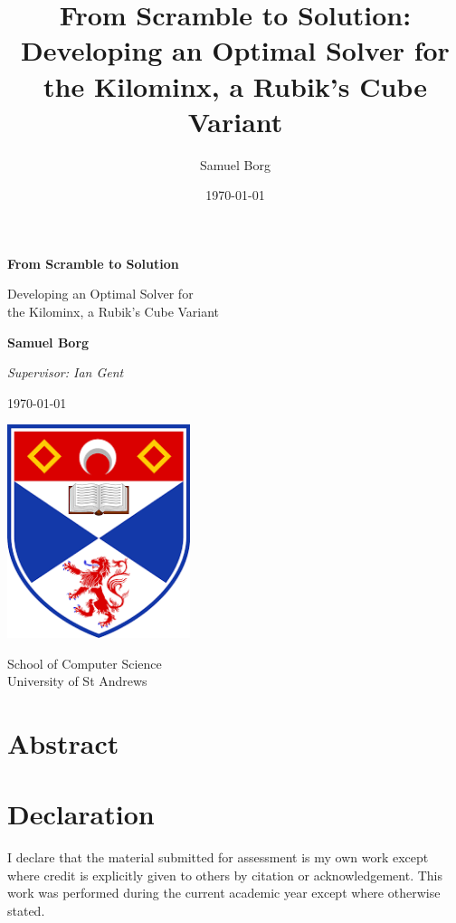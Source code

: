 \documentclass[12pt]{report}
\title{From Scramble to Solution: Developing an Optimal Solver for the Kilominx, a Rubik's Cube Variant}
\author{Samuel Borg}
\date{\today}
\begin{document}
\begin{titlepage}
    \begin{center}
        \vspace*{1.5cm}
            
        \Huge
        \textbf{From Scramble to Solution}
            
        \vspace{0.5cm}
        \LARGE
        Developing an Optimal Solver for \\ the Kilominx, a Rubik's Cube Variant

        \vspace{2cm}
        \textbf{Samuel Borg}

        \Large
        \textit{Supervisor: Ian Gent}

        \vspace{0.5cm}

        \large
        \today

        \vspace{2.5cm}

        \includegraphics[width=0.4\textwidth]{unilogo}

        \Large
        \vspace{0.5cm}
        School of Computer Science\\
        University of St Andrews
    \end{center}
\end{titlepage}

\chapter*{Abstract}


\chapter*{Declaration}
I declare that the material submitted for assessment is my own work except where credit is explicitly given to others by citation or acknowledgement. This work was performed during the current academic year except where otherwise stated.
\end{document}
